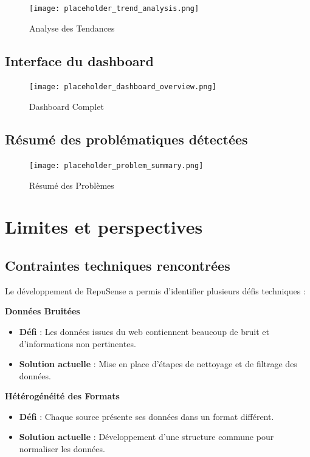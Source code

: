 \documentclass[12pt,a4paper]{report}
\begin{document}
\begin{figure}[h]
    \centering
    \texttt{[image: placeholder\_trend\_analysis.png]}
    \caption{Analyse des Tendances}
\end{figure}

\section{Interface du dashboard}

\begin{figure}[h]
    \centering
    \texttt{[image: placeholder\_dashboard\_overview.png]}
    \caption{Dashboard Complet}
\end{figure}

\section{Résumé des problématiques détectées}

\begin{figure}[h]
    \centering
    \texttt{[image: placeholder\_problem\_summary.png]}
    \caption{Résumé des Problèmes}
\end{figure}

\chapter{Limites et perspectives}

\section{Contraintes techniques rencontrées}
Le développement de RepuSense a permis d'identifier plusieurs défis techniques :

\textbf{Données Bruitées}
\begin{itemize}
    \item \textbf{Défi} : Les données issues du web contiennent beaucoup de bruit et d'informations non pertinentes.
    \item \textbf{Solution actuelle} : Mise en place d'étapes de nettoyage et de filtrage des données.
\end{itemize}

\textbf{Hétérogénéité des Formats}
\begin{itemize}
    \item \textbf{Défi} : Chaque source présente ses données dans un format différent.
    \item \textbf{Solution actuelle} : Développement d'une structure commune pour normaliser les données.
\end{itemize}
\end{document}
